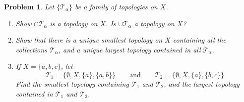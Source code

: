 \documentclass[12pt]{article}
\renewcommand{\=}[1]{\stackrel{#1}{=}} %
\providecommand{\T}{\mathcal{T}}
\newtheorem{p}{Problem}[section]
\theoremstyle{definition}
\begin{document}
\newpage
\begin{p}
    Let $\{\T_{\alpha}\}$ be a family of topologies on $X$.
    \begin{enumerate}
        \item Show $\cap\T_{\alpha}$ is a topology on $X$. Is $\cup\T_{\alpha}$ a topology on $X$?
        \item Show that there is a unique smallest topology on $X$ containing all the collections $\T_{\alpha}$, and
            a unique largest topology contained in all $\T_{\alpha}$.
        \item If $X = \{a,b,c\}$, let
            \[ \T_1 = \{\emptyset, X, \{a\}, \{a,b\}\}\qquad\text{and}\qquad\T_2 = \{\emptyset,X,\{a\},\{b,c\}\} \]
            Find the smallest topology containing $\T_1$ and $\T_2$, and the largest topology contained in $\T_1$ and $\T_2$.
    \end{enumerate}
\end{p}
\end{document}
